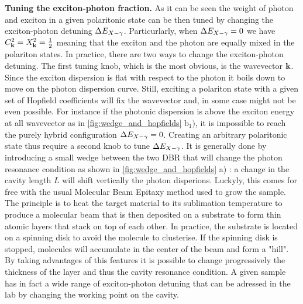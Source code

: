 \textbf{Tuning the exciton-photon fraction.} As it can be seen the weight of photon and exciton in a given polaritonic state can be then tuned by changing the exciton-photon detuning 
$\Delta E_{X-\gamma}$. Particurlarly, when $\Delta E_{X-\gamma} = 0$ we have $C_{\mathbf{k}}^2= X_{\mathbf{k}}^2 = \frac{1}{2}$ meaning that the exciton and the photon are equally mixed in the polariton states. In practice, there are two ways to change the exciton-photon detuning. The first tuning knob, which is the most obvious, is the wavevector $\mathbf{k}$. Since the exciton
dispersion is flat with respect to the photon it boils down to move on the photon dispersion curve. Still, exciting a polariton state with a given set of Hopfield coefficients will fix the wavevector and, in some case might not be even possible. 
For instance if the photonic dispersion is above the exciton energy at all wavevector as in   \autoref{fig:wedge_and_hopfields} $\mathrm{b_1)}$, it is impossible to reach the purely hybrid configuration $\Delta E_{X-\gamma} = 0 $. Creating an arbitrary polaritonic state thus require a second knob to tune $\Delta E_{X-\gamma}$. It is generally done by introducing a small wedge between the two DBR that will change the photon resonance condition as shown in \autoref{fig:wedge_and_hopfields} a) : a change in the cavity length $L$ will shift vertically the photon disperions.
 Luckyly, this comes for free with the usual Molecular Beam Epitaxy method used to grow the sample.
The principle is to heat the target material to its sublimation temperature to produce a molecular beam that is then deposited on a substrate to form thin atomic layers that stack on top of each other.
In practice, the substrate is located on a spinning disk to avoid the molecule to clusterise. If the spinning disk is stopped, molecules will accumulate in the center of the beam and form a "hill".
By taking advantages of this features it is possible to change progressively the thickness of the layer and thus the cavity resonance condition. A given sample
has in fact a wide range of exciton-photon detuning that can be adressed in the lab by changing the working point on the cavity. 

